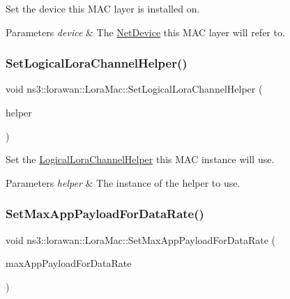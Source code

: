 Set the device this M\+AC layer is installed on.


\begin{DoxyParams}{Parameters}
{\em device} & The \hyperlink{classNetDevice}{Net\+Device} this M\+AC layer will refer to. \\
\hline
\end{DoxyParams}
\mbox{\label{classns3_1_1lorawan_1_1LoraMac_a831dc8e920c489e90bc643ee807ac434}} 
\subsubsection{\texorpdfstring{Set\+Logical\+Lora\+Channel\+Helper()}{SetLogicalLoraChannelHelper()}}
{\footnotesize\ttfamily void ns3\+::lorawan\+::\+Lora\+Mac\+::\+Set\+Logical\+Lora\+Channel\+Helper (\begin{DoxyParamCaption}\item[{\hyperlink{classns3_1_1lorawan_1_1LogicalLoraChannelHelper}{Logical\+Lora\+Channel\+Helper}}]{helper }\end{DoxyParamCaption})}

Set the \hyperlink{classns3_1_1lorawan_1_1LogicalLoraChannelHelper}{Logical\+Lora\+Channel\+Helper} this M\+AC instance will use.


\begin{DoxyParams}{Parameters}
{\em helper} & The instance of the helper to use. \\
\hline
\end{DoxyParams}
\mbox{\label{classns3_1_1lorawan_1_1LoraMac_aba1762b2acb3cc7113e499106bd54cb9}} 
\subsubsection{\texorpdfstring{Set\+Max\+App\+Payload\+For\+Data\+Rate()}{SetMaxAppPayloadForDataRate()}}
{\footnotesize\ttfamily void ns3\+::lorawan\+::\+Lora\+Mac\+::\+Set\+Max\+App\+Payload\+For\+Data\+Rate (\begin{DoxyParamCaption}\item[{std\+::vector$<$ uint32\+\_\+t $>$}]{max\+App\+Payload\+For\+Data\+Rate }\end{DoxyParamCaption})}

